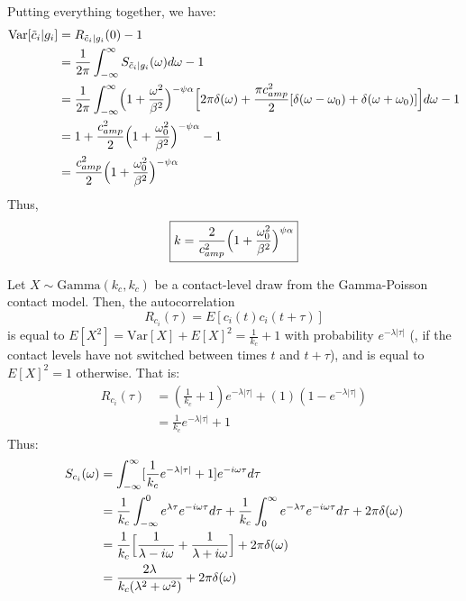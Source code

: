  Putting everything together, we have: 
\begin{align}
\text{Var}[\tilde{c}_i | g_i] &= R_{\tilde{c}_i | g_i}(0) - 1 \\
&= \frac{1}{2\pi} \int_{-\infty}^{\infty} S_{\tilde{c}_i | g_i}(\omega) d\omega  - 1 \\
&= \frac{1}{2\pi} \int_{-\infty}^\infty \Bigl(1 + \frac{\omega^2}{\beta^2}\Bigr)^{-\psi \alpha} 
\Bigl[ 2 \pi \delta(\omega) + \frac{\pi c_{amp}^2}{2} [\delta(\omega - \omega_0) + \delta(\omega + \omega_0)] \Bigr] d \omega  - 1\\ 
&= 1 + \frac{c_{amp}^2}{2} \Bigl(1 + \frac{\omega_0^2}{\beta^2}\Bigr)^{-\psi \alpha} - 1 \\
&= \frac{c_{amp}^2}{2} \Bigl(1 + \frac{\omega_0^2}{\beta^2}\Bigr)^{-\psi \alpha}
\end{align}
Thus, 
\begin{equation}
	\boxed{k = \frac{2}{c_{amp}^2} \Bigl(1 + \frac{\omega_0^2}{\beta^2}\Bigr)^{\psi \alpha}}
\end{equation}

 Let $X \sim \text{Gamma}(k_c, k_c)$ be a contact-level draw from the Gamma-Poisson contact model. Then, the autocorrelation 
\begin{equation}
	R_{c_i}(\tau) = E[c_i(t) c_i(t + \tau)]
\end{equation}
is equal to $E[X^2] = \text{Var}[X] + E[X]^2 = \frac{1}{k_c} + 1$ with probability $e^{-\lambda |\tau|}$ (\ie, if the contact levels have not switched between times $t$ and $t + \tau$), and is equal to $E[X]^2 = 1$ otherwise. That is: 
\begin{align}
	R_{c_i}(\tau) &= (\frac{1}{k_c} +1) e^{-\lambda |\tau|} + (1)(1 - e^{-\lambda |\tau|}) \\ 
	&= \frac{1}{k_c} e^{-\lambda |\tau|} + 1
\end{align}
Thus: 
\begin{align}
S_{c_i}(\omega) &= \int_{-\infty}^{\infty} [\frac{1}{k_c}e^{-\lambda |\tau| } + 1] e^{-i \omega \tau} d\tau \\ 
&= \frac{1}{k_c} \int_{-\infty}^{0} e^{ \lambda \tau} e^{- i \omega \tau} d\tau + 
\frac{1}{k_c} \int_{0}^{\infty} e^{- \lambda \tau } e^{- i \omega \tau} d\tau + 2\pi \delta(\omega) \\ 
&= \frac{1}{k_c} \Bigl[ \frac{1}{\lambda - i \omega} + \frac{1}{\lambda + i \omega} \Bigr]  + 2\pi \delta(\omega) \\
&= \frac{2 \lambda}{k_c (\lambda^2 + \omega^2)} + 2\pi \delta(\omega) 
\end{align}

